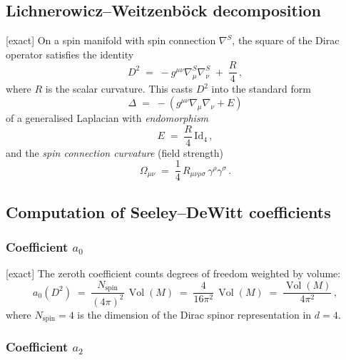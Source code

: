\documentclass[12pt,a4paper]{article}
\theoremstyle{definition}
\theoremstyle{remark}
\newcommand{\Vol}{\operatorname{Vol}}
\newcommand{\exact}{\textcolor{blue!70!black}{\textsf{[exact]}}}
\begin{document}
\subsection{Lichnerowicz--Weitzenb\"ock decomposition}

\exact\;
On a spin manifold with spin connection $\nabla^S$, the square of the
Dirac operator satisfies the identity
\begin{equation}
  D^2
  \;=\;
  -g^{\mu\nu}\nabla^S_\mu \nabla^S_\nu
  \;+\;
  \frac{R}{4}\,,
  \label{eq:LW}
\end{equation}
where $R$ is the scalar curvature.  This casts $D^2$ into the standard
form
\begin{equation}
  \Delta \;=\; -(g^{\mu\nu}\nabla_\mu\nabla_\nu + E)
  \label{eq:laplacian-type}
\end{equation}
of a generalised Laplacian with \emph{endomorphism}
\begin{equation}
  E \;=\; \frac{R}{4}\,\mathrm{Id}_4\,,
  \label{eq:endo}
\end{equation}
and the \emph{spin connection curvature} (field strength)
\begin{equation}
  \Omega_{\mu\nu}
  \;=\;
  \frac{1}{4}\,R_{\mu\nu\rho\sigma}\,\gamma^\rho\gamma^\sigma\,.
  \label{eq:spin-curv}
\end{equation}


\subsection{Computation of Seeley--DeWitt coefficients}

\subsubsection{Coefficient \texorpdfstring{$a_0$}{a0}}

\exact\;
The zeroth coefficient counts degrees of freedom weighted by volume:
\begin{equation}
  a_0(D^2)
  \;=\;
  \frac{N_{\mathrm{spin}}}{(4\pi)^2}\,\Vol(M)
  \;=\;
  \frac{4}{16\pi^2}\,\Vol(M)
  \;=\;
  \frac{\Vol(M)}{4\pi^2}\,,
  \label{eq:a0}
\end{equation}
where $N_{\mathrm{spin}}=4$ is the dimension of the Dirac spinor
representation in $d=4$.

\subsubsection{Coefficient \texorpdfstring{$a_2$}{a2}}
\end{document}
